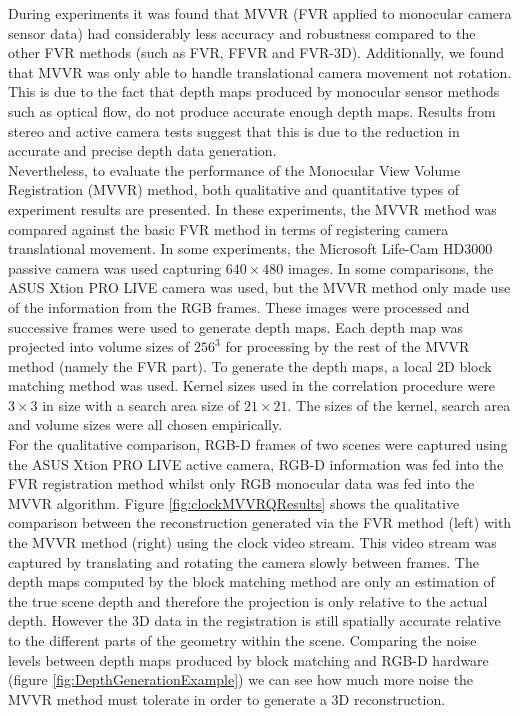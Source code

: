 
During experiments it was found that MVVR (FVR applied to monocular camera sensor data) had considerably less accuracy and robustness compared to the other FVR methods (such as FVR, FFVR and FVR-3D). Additionally, we found that MVVR was only able to handle translational camera movement not rotation. This is due to the fact that depth maps produced by monocular sensor methods such as optical flow, do not produce accurate enough depth maps. Results from stereo and active camera tests suggest that this is due to the reduction in accurate and precise depth data generation. \\

Nevertheless, to evaluate the performance of the Monocular View Volume Registration (MVVR) method, both qualitative and quantitative types of experiment results are presented. In these experiments, the MVVR method was compared against the basic FVR method in terms of registering camera translational movement. In some experiments, the Microsoft Life-Cam HD3000 passive camera was used capturing $640 \times 480$ images. In some comparisons, the ASUS Xtion PRO LIVE camera was used, but the MVVR method only made use of the information from the RGB frames. These images were processed and successive frames were used to generate depth maps. Each depth map was projected into volume sizes of $256^3$ for processing by the rest of the MVVR method (namely the FVR part). To generate the depth maps, a local 2D block matching method was used. Kernel sizes used in the correlation procedure were $3 \times 3$ in size with a search area size of $21 \times 21$. The sizes of the kernel, search area and volume sizes were all chosen empirically. \\

For the qualitative comparison, RGB-D frames of two scenes were captured using the ASUS Xtion PRO LIVE active camera, RGB-D information was fed into the FVR registration method whilst only RGB monocular data was fed into the MVVR algorithm. Figure \ref{fig:clockMVVRQResults} shows the qualitative comparison between the reconstruction generated via the FVR method (left) with the MVVR method (right) using the clock video stream. This video stream was captured by translating and rotating the camera slowly between frames. The depth maps computed by the block matching method are only an estimation of the true scene depth and therefore the projection is only relative to the
actual depth. However the 3D data in the registration is still spatially accurate relative to the different parts of the geometry within the scene. Comparing the noise levels between depth maps produced by block matching and RGB-D hardware (figure \ref{fig:DepthGenerationExample}) we can see how much more noise the MVVR method must tolerate in order to generate a 3D reconstruction. \\



